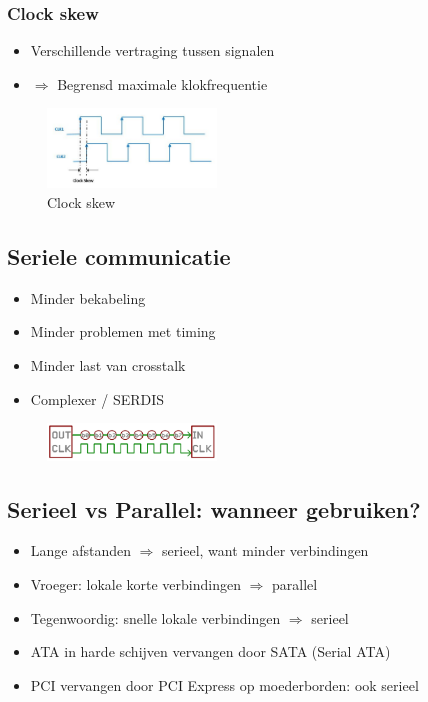 \documentclass{article}
\begin{document}
\subsubsection{Clock skew}
\begin{itemize}
    \item Verschillende vertraging tussen signalen
    \item $\Rightarrow$ Begrensd maximale klokfrequentie
\end{itemize}

\begin{figure}[H]
    \centering
    \includegraphics[width=0.4\textwidth]{Screenshot_20200323_114937.png}
    \caption{Clock skew}
\end{figure}

\subsection{Seriele communicatie}
\begin{itemize}
    \item Minder bekabeling
    \item Minder problemen met timing
    \item Minder last van crosstalk
    \item Complexer / SERDIS
\end{itemize}

\begin{figure}[H]
    \centering
    \includegraphics[width=0.4\textwidth]{Screenshot_20200323_115035.png}
    \caption{}
\end{figure}

\subsection{Serieel vs Parallel: wanneer gebruiken?}
\begin{itemize}
    \item Lange afstanden $\Rightarrow$ serieel, want minder verbindingen
    \item Vroeger: lokale korte verbindingen $\Rightarrow$ parallel
    \item Tegenwoordig: snelle lokale verbindingen $\Rightarrow$ serieel
    \item ATA in harde schijven vervangen door SATA (Serial ATA)
    \item PCI vervangen door PCI Express op moederborden: ook serieel
\end{itemize}
\end{document}

